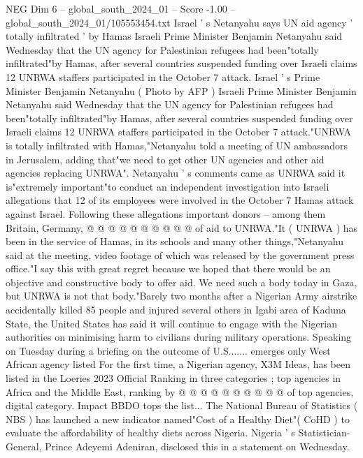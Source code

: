 \begin{textsample}{NEG Dim 6 – global\_south\_2024\_01 – Score -1.00 – global\_south\_2024\_01/105553454.txt}  \label{ex:f6_neg_371}
Israel ' s Netanyahu says UN aid agency ' totally infiltrated ' by Hamas Israeli Prime Minister Benjamin Netanyahu said Wednesday that the UN agency for Palestinian refugees had been"totally infiltrated"by Hamas, after several countries suspended funding over Israeli claims 12 UNRWA staffers participated in the October 7 attack.
Israel ' s Prime Minister Benjamin Netanyahu ( Photo by AFP ) Israeli Prime Minister Benjamin Netanyahu said Wednesday that the UN agency for Palestinian refugees had been"totally infiltrated"by Hamas, after several countries suspended funding over Israeli claims 12 UNRWA staffers participated in the October 7 attack."UNRWA is totally infiltrated with Hamas,"Netanyahu told a meeting of UN ambassadors in Jerusalem, adding that"we need to get other UN agencies and other aid agencies replacing UNRWA".
Netanyahu ' s comments came as UNRWA said it is"extremely important"to conduct an independent investigation into Israeli allegations that 12 of its employees were involved in the October 7 Hamas attack against Israel.
Following these allegations important donors -- among them Britain, Germany, @ @ @ @ @ @ @ @ @ @ of aid to UNRWA."It ( UNRWA ) has been in the service of Hamas, in its schools and many other things,"Netanyahu said at the meeting, video footage of which was released by the government press office."I say this with great regret because we hoped that there would be an objective and constructive body to offer aid.
We need such a body today in Gaza, but UNRWA is not that body."Barely two months after a Nigerian Army airstrike accidentally killed 85 people and injured several others in Igabi area of Kaduna State, the United States has said it will continue to engage with the Nigerian authorities on minimising harm to civilians during military operations.
Speaking on Tuesday during a briefing on the outcome of U.S....... emerges only West African agency listed For the first time, a Nigerian agency, X3M Ideas, has been listed in the Loeries 2023 Official Ranking in three categories ; top agencies in Africa and the Middle East, ranking by @ @ @ @ @ @ @ @ @ @ of top agencies, digital category.
Impact BBDO tops the list...
The National Bureau of Statistics ( NBS ) has launched a new indicator named"Cost of a Healthy Diet"( CoHD ) to evaluate the affordability of healthy diets across Nigeria.
Nigeria ' s Statistician-General, Prince Adeyemi Adeniran, disclosed this in a statement on Wednesday.

\end{textsample}
